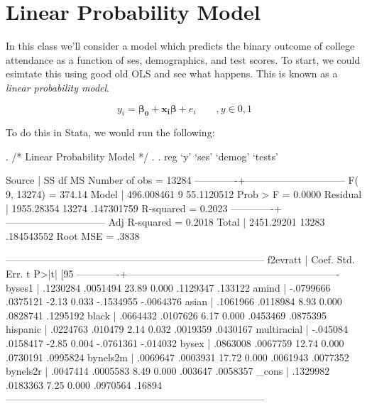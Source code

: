 \documentclass[12pt]{article}
\begin{document}
\section{Linear Probability Model}

In this class we'll consider a model which predicts the binary outcome
of college attendance as a function of ses, demographics, and test
scores. To start, we could esimtate this using good old OLS and
see what happens. This is known as a \textit{linear probability
  model}.

\begin{equation*}
  y_i=\mathbf{\beta_0 + x_i\beta} + e_i \qquad, y \in {0,1}
\end{equation*}



To do this in Stata, we would run the following:



\begin{stlog}

. /* Linear Probability Model */
. 
. reg `y' `ses' `demog' `tests'

      Source |       SS       df       MS              Number of obs =   13284
-------------+------------------------------           F(  9, 13274) =  374.14
       Model |  496.008461     9  55.1120512           Prob > F      =  0.0000
    Residual |  1955.28354 13274  .147301759           R-squared     =  0.2023
-------------+------------------------------           Adj R-squared =  0.2018
       Total |  2451.29201 13283  .184543552           Root MSE      =   .3838

------------------------------------------------------------------------------
    f2evratt |      Coef.   Std. Err.      t    P>|t|     [95%
-------------+----------------------------------------------------------------
      byses1 |   .1230284   .0051494    23.89   0.000     .1129347     .133122
       amind |  -.0799666   .0375121    -2.13   0.033    -.1534955   -.0064376
       asian |   .1061966   .0118984     8.93   0.000     .0828741    .1295192
       black |   .0664432   .0107626     6.17   0.000     .0453469    .0875395
    hispanic |   .0224763    .010479     2.14   0.032     .0019359    .0430167
 multiracial |   -.045084   .0158417    -2.85   0.004    -.0761361    -.014032
       bysex |   .0863008   .0067759    12.74   0.000     .0730191    .0995824
    bynels2m |   .0069647   .0003931    17.72   0.000     .0061943    .0077352
    bynels2r |   .0047414   .0005583     8.49   0.000      .003647    .0058357
       _cons |   .1329982   .0183363     7.25   0.000     .0970564      .16894
------------------------------------------------------------------------------
 
  \end{stlog}
\end{document}
